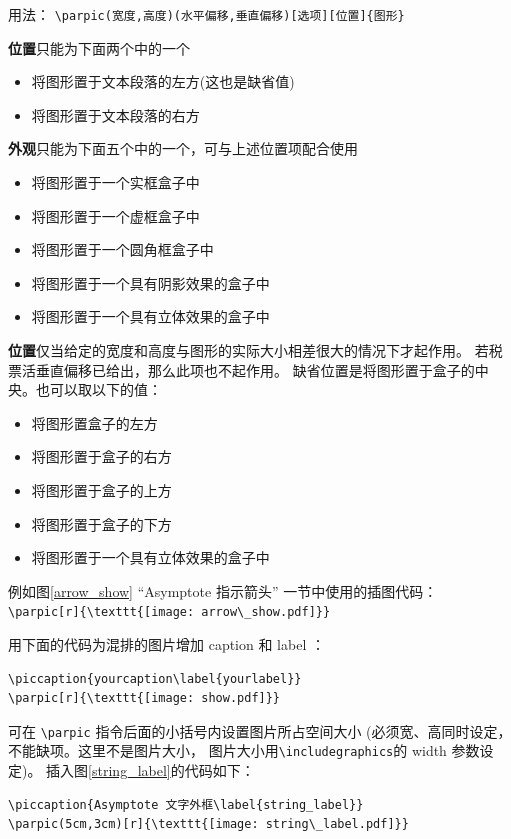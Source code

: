 \documentclass[a4paper,11pt]{article}
\begin{document}
用法：%
\verb+\parpic(宽度,高度)(水平偏移,垂直偏移)[选项][位置]{图形}+

{\bf 位置}只能为下面两个中的一个
\begin{itemize}
	\item [l] 将图形置于文本段落的左方(这也是缺省值)
	\item [r] 将图形置于文本段落的右方
\end{itemize}

{\bf 外观}只能为下面五个中的一个，可与上述位置项配合使用
\begin{itemize}
	\item [f] 将图形置于一个实框盒子中
	\item [d] 将图形置于一个虚框盒子中
	\item [o] 将图形置于一个圆角框盒子中
	\item [s] 将图形置于一个具有阴影效果的盒子中
	\item [x] 将图形置于一个具有立体效果的盒子中	
\end{itemize}

{\bf 位置}仅当给定的宽度和高度与图形的实际大小相差很大的情况下才起作用。
若税票活垂直偏移已给出，那么此项也不起作用。
缺省位置是将图形置于盒子的中央。也可以取以下的值：
\begin{itemize}
	\item [l] 将图形置盒子的左方
	\item [r] 将图形置于盒子的右方
	\item [t] 将图形置于盒子的上方
	\item [b] 将图形置于盒子的下方
	\item [x] 将图形置于一个具有立体效果的盒子中	
\end{itemize}
例如图\ref{arrow_show} ``Asymptote 指示箭头'' 一节中使用的插图代码：\\
\verb+\parpic[r]{\texttt{[image: arrow\_show.pdf]}}+

用下面的代码为混排的图片增加 caption 和 label ：
\begin{Verbatim}
\piccaption{yourcaption\label{yourlabel}}
\parpic[r]{\texttt{[image: show.pdf]}}
\end{Verbatim}

可在 \verb+\parpic+ 指令后面的小括号内设置图片所占空间大小%
(必须宽、高同时设定，不能缺项。这里不是图片大小，
图片大小用\verb+\includegraphics+的 width 参数设定)。
插入图\ref{string_label}的代码如下：
\begin{Verbatim}
\piccaption{Asymptote 文字外框\label{string_label}}
\parpic(5cm,3cm)[r]{\texttt{[image: string\_label.pdf]}}
\end{Verbatim}
\end{document}
